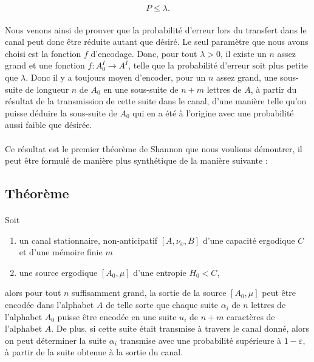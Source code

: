 	\[P\le \lambda.\]
	
	\paragraph{}Nous venons ainsi de prouver que la probabilité d'erreur lors 
	du transfert dans le canal peut donc être réduite autant que désiré.
	Le seul paramètre que nous avons choisi est la fonction $f$ d'encodage.
	Donc, pour tout $\lambda >0$, il existe un $n$ assez grand et
	une fonction $f : A_0^I \to A^I$, telle que la probabilité d'erreur 
	soit plus petite que $\lambda$. Donc il y a toujours moyen d'encoder,
	pour un $n$ assez grand, une sous-suite de longueur $n$ de $A_0$ 
	en une sous-suite de $n+m$ lettres de $A$, à partir du résultat 
	de la transmission de cette suite dans le canal, d'une manière telle
	qu'on puisse déduire la sous-suite de $A_0$ qui en a été à l'origine 
	avec une probabilité aussi faible que désirée.
	
	\paragraph{}
	Ce résultat est le premier théorème de Shannon que nous voulions démontrer,
	il peut être formulé de manière plus synthétique de la manière suivante :
	
\subsection*{Théorème}
	
	\paragraph{}
	Soit 
	\begin{enumerate}
		\item un canal stationnaire, non-anticipatif $[A,\nu_x,B]$ d'une 
			capacité ergodique $C$ et d'une mémoire finie $m$
		\item une source ergodique $[A_0,\mu]$ d'une entropie $H_0<C$,
	\end{enumerate}
	alors pour tout $n$ suffisamment grand, la sortie de la source
	$[A_0,\mu]$ peut être encodée dans l'alphabet $A$ de telle sorte que
	chaque suite $\alpha_i$ de $n$ lettres de l'alphabet $A_0$ puisse
	être encodée en une suite $u_i$ de $n+m$ caractères de l'alphabet $A$. 
	De plus, si cette suite était transmise à travers le canal donné, alors
	on peut déterminer la suite $\alpha_i$ transmise avec une probabilité 
	supérieure à $1-\varepsilon$, à partir de la suite obtenue à la sortie 
	du canal.
	
